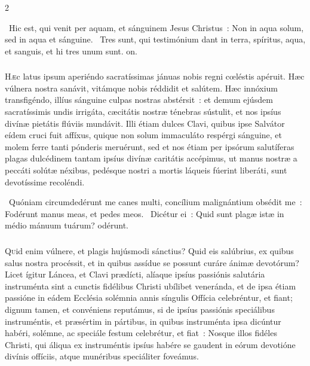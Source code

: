 \documentclass[9pt,twoside]{extarticle}
\begin{document}
\begin{multicols}{2}
\begin{tightlist}{}
\item {}~Hic est, qui venit per aquam, et sánguinem Jesus Christus~: \textred{*} Non in aqua solum, sed in aqua et sánguine. ~Tres sunt, qui testimónium dant in terra, spíritus, aqua, et sanguis, et hi tres unum sunt. on.
\end{tightlist}

\subsubsection*{\center {}}
\lettrine{H}æc latus ipsum aperiéndo sacratíssimas jánuas nobis regni cœléstis apéruit. Hæc vúlnera nostra sanávit, vitámque nobis réddidit et salútem. Hæc innóxium transfigéndo, illíus sánguine culpas nostras abstérsit~: et demum ejúsdem sacratíssimis undis irrigáta, cæcitátis nostræ ténebras sústulit, et nos ipsíus divínæ pietátis flúviis mundávit. Illi étiam dulces Clavi, quibus ipse Salvátor eídem cruci fuit affíxus, quique non solum immaculáto respérgi sánguine, et molem ferre tanti pónderis meruérunt, sed et nos étiam per ipsórum salutíferas plagas dulcédinem tantam ipsíus divínæ caritátis accépimus, ut manus nostræ a peccáti solútæ néxibus, pedésque nostri a mortis láqueis fúerint liberáti, sunt devotíssime recoléndi.

\begin{tightlist}{}
\item {}~Quóniam circumdedérunt me canes multi, concílium malignántium obsédit me~: \textred{*} Fodérunt manus meas, et pedes meos. ~Dicétur ei~: Quid sunt plagæ istæ in médio mánuum tuárum? odérunt.
\end{tightlist}

\subsubsection*{\center {}}
\lettrine{Q}uid enim vúlnere, et plagis hujúsmodi sánctius? Quid eis salúbrius, ex quibus salus nostra procéssit, et in quibus assídue se possunt curáre ánimæ devotórum? Licet ígitur Láncea, et Clavi prædícti, alíaque ipsíus passiónis salutária instruménta sint a cunctis fidélibus Christi ubílibet veneránda, et de ipsa étiam passióne in eádem Ecclésia solémnia annis síngulis Offícia celebréntur, et fiant; dignum tamen, et convéniens reputámus, si de ipsíus passiónis speciálibus instruméntis, et præsértim in pártibus, in quibus instruménta ipsa dicúntur habéri, solémne, ac speciále festum celebrétur, et fiat~: Nosque illos fidéles Christi, qui áliqua ex instruméntis ipsíus habére se gaudent in eórum devotióne divínis offíciis, atque munéribus speciáliter foveámus.


\end{multicols}
\end{document}
